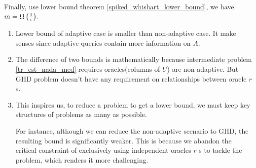\documentclass[10pt]{book}
\begin{document}
{%




Finally, use lower bound theorem \ref{spiked_whishart_lower_bound}, we have $m=\Omega\left(\frac{1}{\epsilon}\right)$.
}

\begin{rmk}
\begin{enumerate}
    \item Lower bound of adaptive case is smaller than non-adaptive case. It make senses since adaptive queries contain more information on $A$.
    \item The difference of two bounds is mathematically because intermediate problem \ref{tr_est_nada_med} requires oracles(columns of $U$) are non-adaptive. But GHD problem doesn't have any requirement on relationships between oracle $r$ s.
    \item This inspires us, to reduce a problem to get a lower bound, we must keep key structures of problems as many as possible. 
    
    For instance, although we can reduce the non-adaptive scenario to GHD, the resulting bound is significantly weaker. This is because we abandon the critical constraint of exclusively using independent oracles $r$ s to tackle the problem, which renders it more challenging.
\end{enumerate}
\end{rmk}

\end{document}
